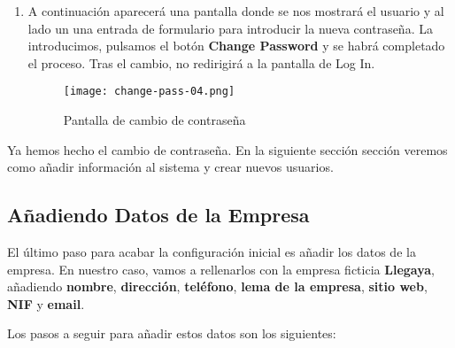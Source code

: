 \begin{enumerate}
    \item A continuación aparecerá una pantalla donde se nos mostrará el usuario y al lado un una entrada de formulario para introducir la nueva contraseña. La introducimos, pulsamos el botón \textbf{Change Password} y se habrá completado el proceso. Tras el cambio, no redirigirá a la pantalla de Log In.

    \begin{figure}[h]
        \centering
        \texttt{[image: change-pass-04.png]}
        \caption{Pantalla de cambio de contraseña}
    \end{figure}
\end{enumerate}

Ya hemos hecho el cambio de contraseña. En la siguiente sección sección veremos como añadir información al sistema y crear nuevos usuarios.

\subsection{Añadiendo Datos de la Empresa}
El último paso para acabar la configuración inicial es añadir los datos de la empresa. En nuestro caso, vamos a rellenarlos con la empresa ficticia \textbf{Llegaya}, añadiendo \textbf{nombre}, \textbf{dirección}, \textbf{teléfono}, \textbf{lema de la empresa}, \textbf{sitio web}, \textbf{NIF} y \textbf{email}.

Los pasos a seguir para añadir estos datos son los siguientes:

